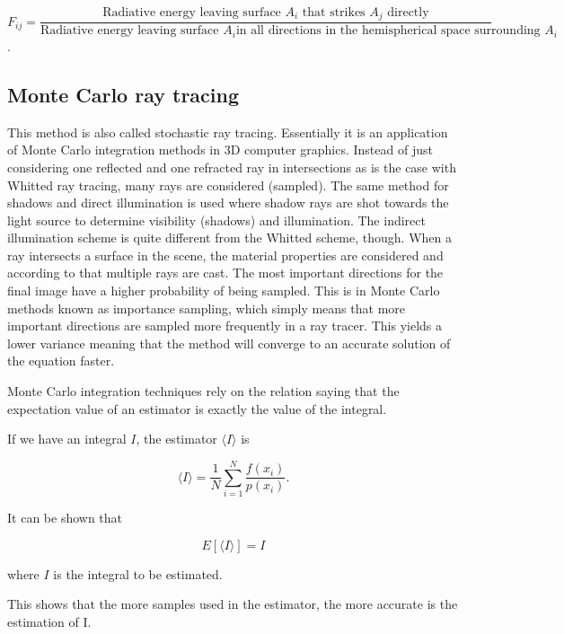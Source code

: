 \documentclass[a4paper]{report}
\begin{document}
\begin{equation}
  F_{ij} = \frac{\text{Radiative energy leaving surface } A_i \text{ that
    strikes } A_j \text{ directly}}{\text{Radiative energy leaving
    surface } A_i \text{in all directions in the hemispherical space
    surrounding } A_i}
\end{equation}.

\subsection{Monte Carlo ray tracing}

This method is also called stochastic ray tracing. Essentially it is
an application of Monte Carlo integration methods in 3D computer
graphics. Instead of just considering one reflected and one refracted
ray in intersections as is the case with Whitted ray tracing, many
rays are considered (sampled). The same method for shadows and direct
illumination is used where shadow rays are shot towards the
light source to determine visibility (shadows) and illumination. The
indirect illumination scheme is quite different from the Whitted
scheme, though. When a ray intersects a surface in the scene, the
material properties are considered and according to that multiple rays
are cast. The most important directions for the final image have a
higher probability of being sampled. This is in Monte Carlo methods
known as importance sampling, which simply means that more important
directions are sampled more frequently in a ray tracer. This yields a
lower variance meaning that the method will converge to an accurate
solution of the equation faster.

Monte Carlo integration techniques rely on the relation saying that the expectation value
of an estimator is exactly the value of the integral.

If we have an integral \(I\), the estimator \(\langle I \rangle\) is

\begin{equation}
  \langle I \rangle = \frac{1}{N}\sum^N_{i=1}\frac{f(x_i)}{p(x_i)}.
  \label{eq:estimator}
\end{equation}

It can be shown that 

\begin{equation}
  E[\langle I \rangle] = I
\end{equation}

where \(I\) is the integral to be estimated.

This shows that the more samples used in the estimator, the more
accurate is the estimation of I.
\end{document}

